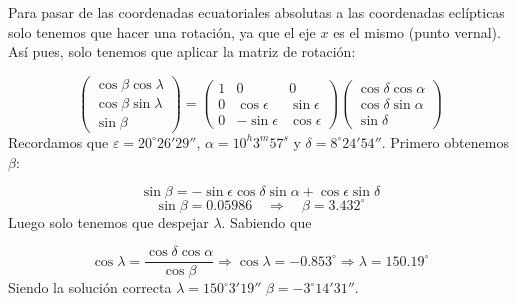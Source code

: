 	Para pasar de las coordenadas ecuatoriales absolutas a las coordenadas eclípticas solo tenemos que hacer una rotación, ya que el eje $x$ es el mismo (punto vernal). Así pues, solo tenemos que aplicar la matriz de rotación:

	\begin{equation}
		\begin{pmatrix}
			\cos \beta \cos \lambda \\
			\cos \beta \sin \lambda \\
			\sin \beta
		\end{pmatrix} =\begin{pmatrix}
			1 & 0 & 0 \\
			0 & \cos \epsilon & \sin \epsilon \\
			0 & -\sin \epsilon &  \cos \epsilon
		\end{pmatrix}
		\begin{pmatrix}
			\cos \delta \cos \alpha \\
			\cos \delta \sin \alpha \\
			\sin \delta
		\end{pmatrix}
	\end{equation}
	Recordamos que $\varepsilon=20^\circ 26' 29''$, $\alpha = 10^{h}3^{m}57^{s}$ y $\delta = 8^\circ24'54''$. Primero obtenemos $\beta$:

	\begin{equation}
		\sin \beta = - \sin \epsilon \cos \delta \sin \alpha + \cos \epsilon \sin \delta
	\end{equation}
	\begin{equation}
		\sin \beta = 0.05986\quad \Longrightarrow \quad \beta = 3.432^\circ
	\end{equation}
	Luego solo tenemos que despejar $\lambda$. Sabiendo que

	\begin{equation}
		\cos \lambda = \frac{\cos \delta \cos \alpha}{\cos \beta} \Rightarrow \cos \lambda = -0.853^\circ \Rightarrow \lambda = 150.19^\circ
	\end{equation}
	Siendo la solución correcta $\lambda = 150^\circ3'19''$	$\beta = -3^\circ14'31''$.

